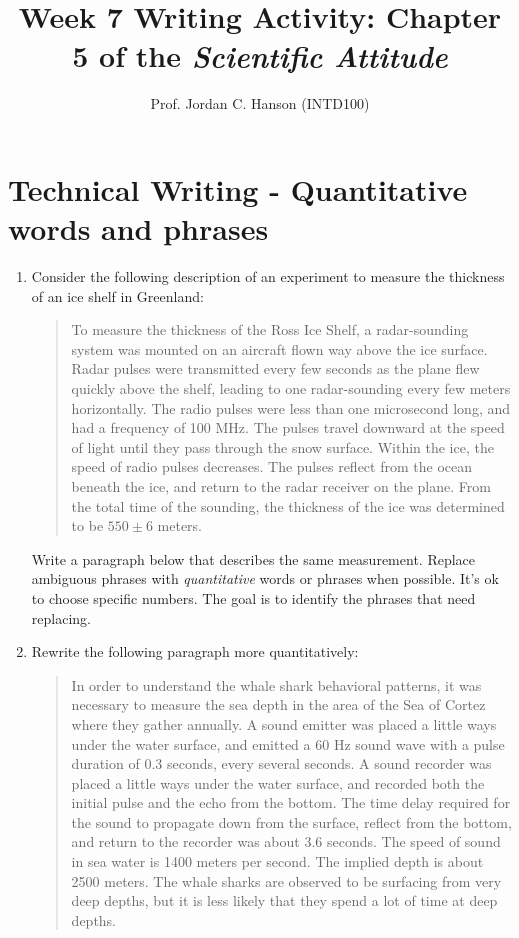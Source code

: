 \documentclass{article}
\begin{document}
\title{Week 7 Writing Activity: Chapter 5 of the \textit{Scientific Attitude}}
\author{Prof. Jordan C. Hanson (INTD100)}

\maketitle

\section{Technical Writing - Quantitative words and phrases}
\begin{enumerate}
\item Consider the following description of an experiment to measure the thickness of an ice shelf in Greenland:
\begin{quotation}
To measure the thickness of the Ross Ice Shelf, a radar-sounding system was mounted on an aircraft flown way above the ice surface.  Radar pulses were transmitted every few seconds as the plane flew quickly above the shelf, leading to one radar-sounding every few meters horizontally.  The radio pulses were less than one microsecond long, and had a frequency of 100 MHz.  The pulses travel downward at the speed of light until they pass through the snow surface.  Within the ice, the speed of radio pulses decreases.  The pulses reflect from the ocean beneath the ice, and return to the radar receiver on the plane.  From the total time of the sounding, the thickness of the ice was determined to be $550 \pm 6$ meters.
\end{quotation}
Write a paragraph below that describes the same measurement.  Replace ambiguous phrases with \textit{quantitative} words or phrases when possible.  It's ok to choose specific numbers.  The goal is to identify the phrases that need replacing. \\ \vspace{4cm}
\item Rewrite the following paragraph more quantitatively:
\begin{quotation}
In order to understand the whale shark behavioral patterns, it was necessary to measure the sea depth in the area of the Sea of Cortez where they gather annually.  A sound emitter was placed a little ways under the water surface, and emitted a 60 Hz sound wave with a pulse duration of 0.3 seconds, every several seconds.  A sound recorder was placed a little ways under the water surface, and recorded both the initial pulse and the echo from the bottom.  The time delay required for the sound to propagate down from the surface, reflect from the bottom, and return to the recorder was about 3.6 seconds.  The speed of sound in sea water is 1400 meters per second.  The implied depth is about 2500 meters.  The whale sharks are observed to be surfacing from very deep depths, but it is less likely that they spend a lot of time at deep depths.
\end{quotation}
\end{enumerate}
\end{document}
